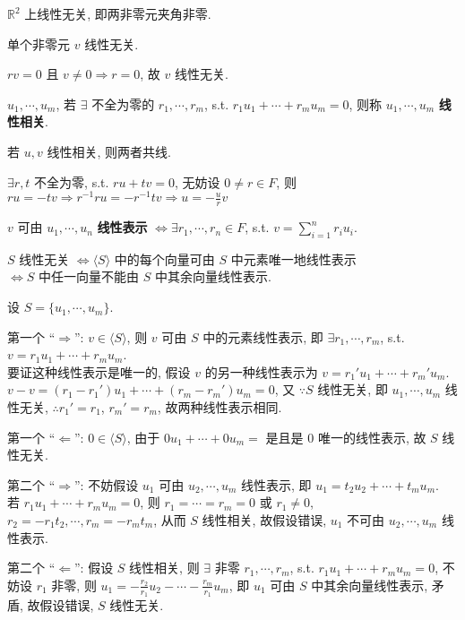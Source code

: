 \documentclass{note}
\begin{document}
\begin{eg}
    $\mathbb{R}^2$ 上线性无关, 即两非零元夹角非零.
\end{eg}

单个非零元 $v$ 线性无关.
\begin{pf}
    $rv=0$ 且 $v\neq 0\Longrightarrow r=0$, 故 $v$ 线性无关.
\end{pf}

\begin{df}[线性相关]
    $u_1,\cdots,u_m$, 若 $\exists$ 不全为零的 $r_1,\cdots,r_m$, s.t. $r_1u_1+\cdots+r_mu_m=0$, 则称 $u_1,\cdots,u_m$ \textbf{线性相关}.
\end{df}

若 $u,v$ 线性相关, 则两者共线.
\begin{pf}
    $\exists r,t$ 不全为零, s.t. $ru+tv=0$, 无妨设 $0\neq r\in F$, 则 $ru=-tv\Longrightarrow r^{-1}ru=-r^{-1}tv\Longrightarrow u=-\frac{u}{r}v$
\end{pf}

\begin{df}[线性表示]
    $v$ 可由 $u_1,\cdots,u_n$ \textbf{线性表示} $\Longleftrightarrow\exists r_1,\cdots,r_n\in F$, s.t. $v=\sum_{i=1}^nr_iu_i$.
\end{df}

\begin{thm}[(课本定理 1.6)]\label{thm-1.6}
    $S$ 线性无关 $\Longleftrightarrow\langle S\rangle$ 中的每个向量可由 $S$ 中元素唯一地线性表示\\
    $\Longleftrightarrow S$ 中任一向量不能由 $S$ 中其余向量线性表示.
\end{thm}
\begin{pf}
    设 $S=\{u_1,\cdots,u_m\}$.

    第一个 ``$\Longrightarrow$'': $v\in\langle S\rangle$, 则 $v$ 可由 $S$ 中的元素线性表示, 即 $\exists r_1,\cdots,r_m$, s.t. $v=r_1u_1+\cdots+r_mu_m$.\\
    要证这种线性表示是唯一的, 假设 $v$ 的另一种线性表示为 $v=r_1'u_1+\cdots+r_m'u_m$.\\
    $v-v=(r_1-r_1')u_1+\cdots+(r_m-r_m')u_m=0$, 又 $\because S$ 线性无关, 即 $u_1,\cdots,u_m$ 线性无关, $\therefore r_1'=r_1$, $r_m'=r_m$, 故两种线性表示相同.

    第一个 ``$\Longleftarrow$'': $0\in\langle S\rangle$, 由于 $0u_1+\cdots+0u_m=$ 是且是 $0$ 唯一的线性表示, 故 $S$ 线性无关.

    第二个 ``$\Longrightarrow$'': 不妨假设 $u_1$ 可由 $u_2,\cdots,u_m$ 线性表示, 即 $u_1=t_2u_2+\cdots+t_mu_m$.\\
    若 $r_1u_1+\cdots+r_mu_m=0$, 则 $r_1=\cdots=r_m=0$ 或 $r_1\neq 0$, $r_2=-r_1t_2,\cdots,r_m=-r_mt_m$, 从而 $S$ 线性相关, 故假设错误, $u_1$ 不可由 $u_2,\cdots,u_m$ 线性表示.

    第二个 ``$\Longleftarrow$'': 假设 $S$ 线性相关, 则 $\exists$ 非零 $r_1,\cdots,r_m$, s.t. $r_1u_1+\cdots+r_mu_m=0$, 不妨设 $r_1$ 非零, 则 $u_1=-\frac{r_2}{r_1}u_2-\cdots-\frac{r_m}{r_1}u_m$, 即 $u_1$ 可由 $S$ 中其余向量线性表示, 矛盾, 故假设错误, $S$ 线性无关.
\end{pf}
\end{document}
